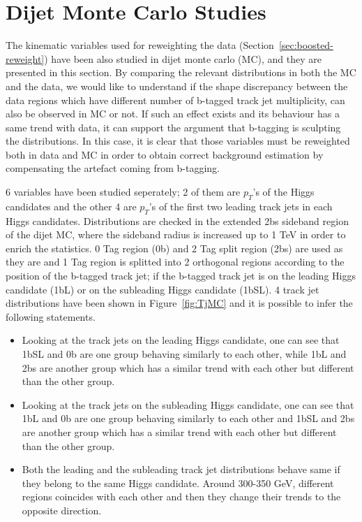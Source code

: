 \section{Dijet Monte Carlo Studies} %
\label{app:dijetMC_studies}

The kinematic variables used for reweighting the data (Section~\ref{sec:boosted-reweight}) have been also studied in dijet monte carlo (MC), and they are presented in this section. By comparing the relevant distributions in both the MC and the data, we would like to understand if the shape discrepancy between the data regions which have different number of b-tagged track jet multiplicity, can also be observed in MC or not. If such an effect exists and its behaviour has a same trend with data, it can support the argument that b-tagging is sculpting the distributions. In this case, it is clear that those variables must be reweighted both in data and MC in order to obtain correct background estimation by compensating the artefact coming from b-tagging.

6 variables have been studied seperately; 2 of them are $p_{T}$'s of the Higgs candidates and the other 4 are $p_{T}$'s of the first two leading track jets in each Higgs candidates. Distributions are checked in the extended 2bs sideband region of the dijet MC, where the sideband radius is increased up to 1 TeV in order to enrich the statistics.  0 Tag region (0b) and 2 Tag split region (2bs) are used as they are and 1 Tag region is splitted into 2 orthogonal regions according to the position of the b-tagged track jet; if the b-tagged track jet is on the leading Higgs candidate (1bL) or on the subleading Higgs candidate (1bSL). 4 track jet distributions have been shown in Figure~\ref{fig:TjMC} and it is possible to infer the following statements.

\begin{itemize}
\item Looking at the track jets on the leading Higgs candidate, one can see that 1bSL and 0b are one group behaving similarly to each other, while 1bL and 2bs are another group which has a similar trend with each other but different than the other group. 
\item Looking at the track jets on the subleading Higgs candidate, one can see that 1bL and 0b are one group behaving similarly to each other and 1bSL and 2bs are another group which has a similar trend with each other but different than the other group.
\item Both the leading and the subleading track jet distributions behave same if they belong to the same Higgs candidate. Around 300-350 GeV, different regions coincides with each other and then they change their trends to the opposite direction.
\end{itemize}
 
